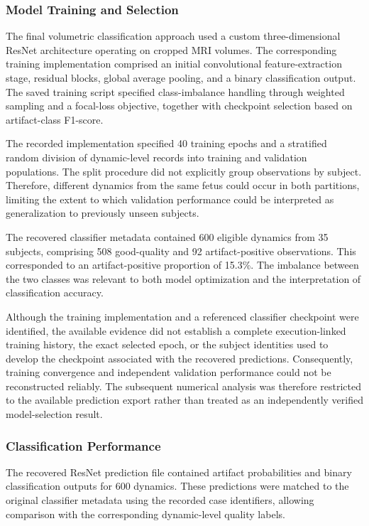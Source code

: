 \subsubsection{Model Training and Selection}
\label{subsec:results_3d_model_selection}

The final volumetric classification approach used a custom three-dimensional ResNet architecture operating on cropped MRI volumes. The corresponding training implementation comprised an initial convolutional feature-extraction stage, residual blocks, global average pooling, and a binary classification output. The saved training script specified class-imbalance handling through weighted sampling and a focal-loss objective, together with checkpoint selection based on artifact-class F1-score.

The recorded implementation specified 40 training epochs and a stratified random division of dynamic-level records into training and validation populations. The split procedure did not explicitly group observations by subject. Therefore, different dynamics from the same fetus could occur in both partitions, limiting the extent to which validation performance could be interpreted as generalization to previously unseen subjects.

The recovered classifier metadata contained 600 eligible dynamics from 35 subjects, comprising 508 good-quality and 92 artifact-positive observations. This corresponded to an artifact-positive proportion of 15.3\%. The imbalance between the two classes was relevant to both model optimization and the interpretation of classification accuracy.

Although the training implementation and a referenced classifier checkpoint were identified, the available evidence did not establish a complete execution-linked training history, the exact selected epoch, or the subject identities used to develop the checkpoint associated with the recovered predictions. Consequently, training convergence and independent validation performance could not be reconstructed reliably. The subsequent numerical analysis was therefore restricted to the available prediction export rather than treated as an independently verified model-selection result.

\subsubsection{Classification Performance}
\label{subsec:results_3d_classification_metrics}

The recovered ResNet prediction file contained artifact probabilities and binary classification outputs for 600 dynamics. These predictions were matched to the original classifier metadata using the recorded case identifiers, allowing comparison with the corresponding dynamic-level quality labels.

